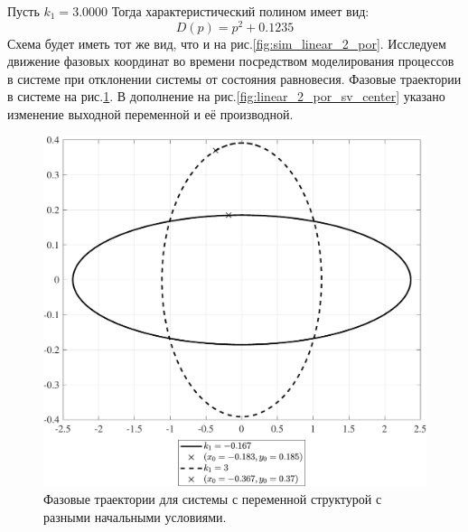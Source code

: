 Пусть $k_1=3.0000$
Тогда характеристический полином имеет вид:
\begin{equation} \label{eq:elips2}
D(p)=p^2+0.1235
\end{equation}
Схема будет иметь тот же вид, что и на рис.\ref{fig:sim_linear_2_por}.
Исследуем движение фазовых координат во времени посредством моделирования процессов в системе при отклонении системы от состояния равновесия. Фазовые траектории в системе на рис.\ref{fig:linear_2_por_ft_center}. 
В дополнение на рис.\ref{fig:linear_2_por_sv_center} указано изменение выходной переменной и её производной. 
\begin{figure}[!h]\centering
\includegraphics[width=1.0\linewidth]{images/linear_2_por_ft_center}
\caption{ Фазовые траектории для системы с переменной структурой с разными начальными условиями.}\label{fig:linear_2_por_ft_center}
\end{figure}
